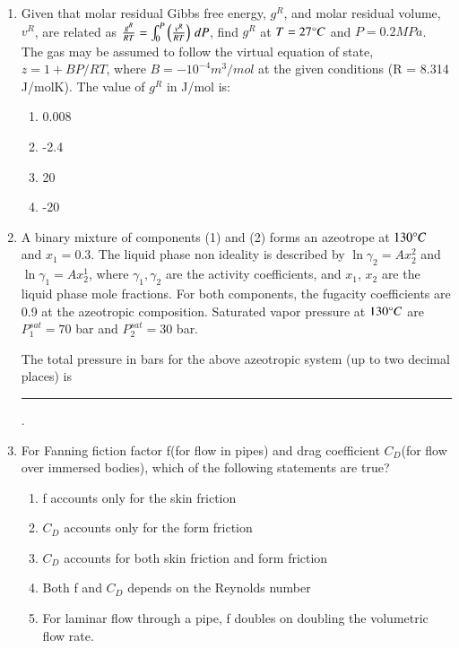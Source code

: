 \documentclass[journal,12pt,onecolumn]{IEEEtran}
\theoremstyle{remark}
\begin{document}
\begin{enumerate}
\hfill{}
    \item Given that molar residual Gibbs free energy, $g^R$, and molar residual volume, $v^R$, are related as $\frac{g^R}{RT}=\int_{0}^{P}\left(\frac{v^R}{RT}\right)\, dP$, find $g^R$ at $T = 27\degree C$ and $P = 0.2MPa$. The gas may be assumed to follow the virtual equation of state, $z=1+BP/RT$, where $B = -10^{-4}m^3/mol$ at the given conditions (R = 8.314 J/molK). The value of $g^R$ in J/mol is:

\hfill{}
\begin{enumerate}
    \item 0.008
    \item -2.4
    \item 20
    \item -20
\end{enumerate}

    \item A binary mixture of components (1) and (2) forms an azeotrope at $130\degree C$ and $x_1 = 0.3$. The liquid phase non ideality is described by $\ln\gamma_2 = Ax^{2}_2$ and $\ln\gamma_1 = Ax^{1}_2$, where $\gamma_1, \gamma_2$ are the activity coefficients, and $x_1$, $x_2$ are the liquid phase mole fractions. For both components, the fugacity coefficients are 0.9 at the azeotropic composition. Saturated vapor pressure at $130\degree C$ are $P^{sat}_1=70$ bar and $P^{sat}_2= 30$ bar.

    The total pressure in bars for the above azeotropic system (up to two decimal places) is \rule{40pt}{0.1mm}.

\hfill{}
    \item For Fanning fiction factor f(for flow in pipes) and drag coefficient $C_D$(for flow over immersed bodies), which of the following statements are true?

\hfill{}
\begin{enumerate}[label = \Alph*]
    \item f accounts only for the skin friction
    \item $C_D$ accounts only for the form friction
    \item $C_D$ accounts for both skin friction and form friction
    \item Both f and $C_D$ depends on the Reynolds number
    \item For laminar flow through a pipe, f doubles on doubling the volumetric flow rate.
\end{enumerate}


\end{enumerate}
\end{document}
